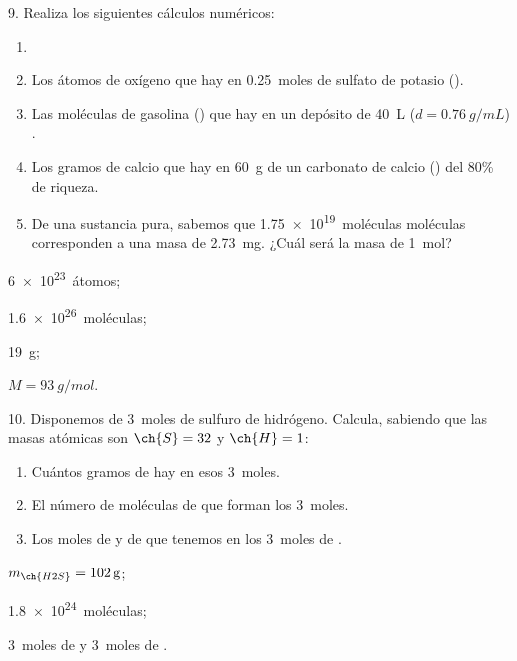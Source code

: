 \documentclass[11pt]{article}
\begin{document}
\begin{multicols}{2}
\begin{exercise}
  9. Realiza los siguientes cálculos numéricos:
  \begin{enumerate}
    \item
    \item Los átomos de oxígeno que hay en \SI{0.25}{moles} de sulfato
    de potasio ().
    \item Las moléculas de gasolina () que hay en un depósito
    de \SI{40}{\liter} ($d = \SI{0.76}{g/mL}$) .
    \item Los gramos de calcio que hay en \SI{60}{g} de un carbonato de
    calcio () del 80\% de riqueza.
    \item De una sustancia pura, sabemos que \SI{1.75e19}{moléculas} moléculas
    corresponden a una masa de \SI{2.73}{mg}. ¿Cuál será la masa de \SI{1}{mol}?
  \end{enumerate}
\end{exercise}
\begin{solution}
  \begin{enumerate*}
    \item \SI{6e23}{átomos}; \item \SI{1.6e26}{moléculas}; \item \SI{19}{g}; \item $M = \SI{93}{g/mol}$.
  \end{enumerate*}
\end{solution}

\begin{exercise}
  10. Disponemos de \SI{3}{moles} de sulfuro de hidrógeno. Calcula,
  sabiendo que las masas atómicas son $\ch{S} = 32$ y $\ch{H} = 1$:
  \begin{enumerate}
    \item Cuántos gramos de  hay en esos \SI{3}{moles}.
    \item El número de moléculas de  que forman los \SI{3}{moles}.
    \item Los moles de  y de  que tenemos en los \SI{3}{moles} de .
  \end{enumerate}
\end{exercise}
\begin{solution}
  \begin{enumerate*}
    \item $m_{\ch{H2S}} = \SI{102}{\gram}$;
    \item \SI{1.8e24}{moléculas};
    \item \SI{3}{moles} de  y \SI{3}{moles} de .
  \end{enumerate*}
\end{solution}


\end{multicols}
\end{document}
